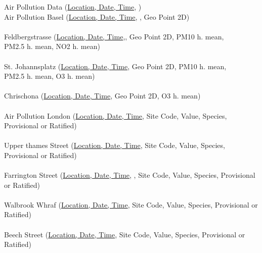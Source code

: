 \documentclass{article}
\begin{document}
\begin{center}
\begin{tabbing}
    Air Pollution Data \> (\uline{Location, Date, Time}, )\\
    Air Pollution Basel \> (\uline{Location, Date, Time}, ,  Geo Point 2D)\\\\
    Feldbergstrasse \> (\uline{Location, Date, Time},, Geo Point 2D, PM10 h. mean,\\ \> PM2.5 h. mean, NO2 h. mean)\\\\
    St. Johannsplatz \> (\uline{Location, Date, Time},  Geo Point 2D, PM10 h. mean,\\ \> PM2.5 h. mean, O3 h. mean)\\\\
    Chrischona \> (\uline{Location, Date, Time},  Geo Point 2D, O3 h. mean)\\
    \\
    Air Pollution London \> (\uline{Location, Date, Time},  Site Code, Value, Species, Provisional or Ratified)\\\\
    Upper thames Street \> (\uline{Location, Date, Time},  Site Code, Value, Species, Provisional or Ratified)\\\\
    Farrington Street \> (\uline{Location, Date, Time}, , Site Code, Value, Species, Provisional or Ratified)\\\\
    Walbrook Whraf \> (\uline{Location, Date, Time},  Site Code, Value, Species, Provisional or Ratified)\\\\
    Beech Street \> (\uline{Location, Date, Time},  Site Code, Value, Species, Provisional or Ratified)\\\\
            

\end{tabbing}
\end{center}
\end{document}
